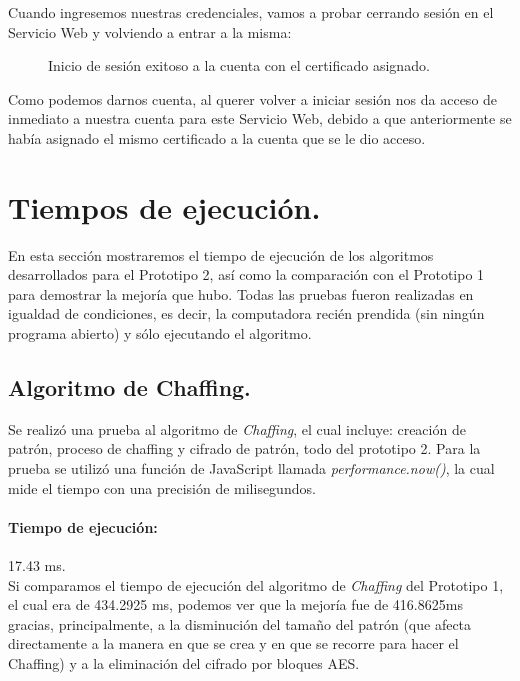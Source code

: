 \documentclass[12pt, a4paper, titlepage]{report}
\begin{document}
    	    Cuando ingresemos nuestras credenciales, vamos a probar cerrando sesión en el Servicio Web y volviendo a entrar a la misma: 
    	    \begin{figure}[H]
    	        \centering
    	        
    	        \caption{Inicio de sesión exitoso a la cuenta con el certificado asignado.}
    	        \label{fig:pruebasLoginHomeUser}
    	    \end{figure}
    	    Como podemos darnos cuenta, al querer volver a iniciar sesión nos da acceso de inmediato a nuestra cuenta para este Servicio Web, debido a que anteriormente se había asignado el mismo certificado a la cuenta que se le dio acceso.
	    
	    
	    \section{Tiempos de ejecución.}
	        En esta sección mostraremos el tiempo de ejecución de los algoritmos desarrollados para el Prototipo 2, así como la comparación con el Prototipo 1 para demostrar la mejoría que hubo. Todas las pruebas fueron realizadas en igualdad de condiciones, es decir, la computadora recién prendida (sin ningún programa abierto) y sólo ejecutando el algoritmo.\\
	        
	        \subsection{Algoritmo de Chaffing.}
	        
                Se realizó una prueba al algoritmo de \textit{Chaffing}, el cual incluye: creación de patrón, proceso de chaffing y cifrado de patrón, todo del prototipo 2. Para la prueba se utilizó una función de JavaScript llamada \textit{performance.now()}, la cual mide el tiempo con una precisión de milisegundos.\\
	            
	            \paragraph{Tiempo de ejecución: } 17.43 ms.\\
	            
	            Si comparamos el tiempo de ejecución del algoritmo de \textit{Chaffing} del Prototipo 1, el cual era de 434.2925 ms, podemos ver que la mejoría fue de 416.8625ms gracias, principalmente, a la disminución del tamaño del patrón (que afecta directamente a la manera en que se crea y en que se recorre para hacer el Chaffing) y a la eliminación del cifrado por bloques AES.
	            
\end{document}
